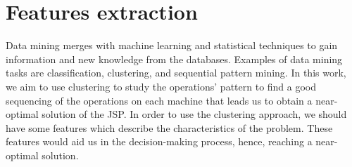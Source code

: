 \documentclass[runningheads]{llncs}
\begin{document}
\section{Features extraction}
\label{sec:features}
Data mining merges with machine learning and statistical techniques to gain information and new knowledge from the databases\cite{ismail2012production,nasiri2019data}. Examples of data mining tasks are classification, clustering, and sequential pattern mining. In this work, we aim to use clustering to study the operations' pattern to find a good sequencing of the operations on each machine that leads us to obtain a near-optimal solution of the JSP. In order to use the clustering approach, we should have some features which describe the characteristics of the problem. These features would aid us in the decision-making process, hence, reaching a near-optimal solution. \\
\end{document}
